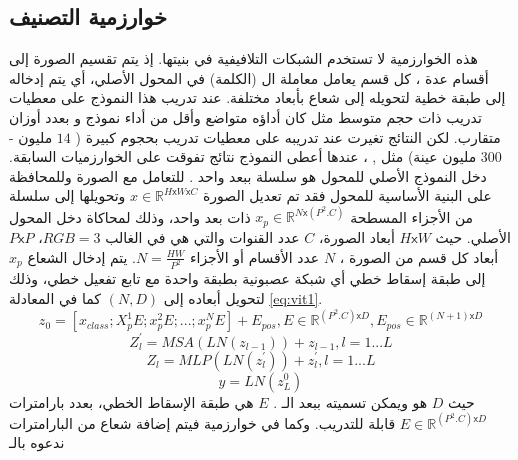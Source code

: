 \subsection{خوارزمية التصنيف
}
هذه الخوارزمية لا تستخدم الشبكات التلافيفية في بنيتها. إذ يتم تقسيم الصورة إلى أقسام عدة
،
كل قسم
يعامل معاملة ال 
(الكلمة) في المحول الأصلي، أي يتم إدخاله إلى طبقة
خطية لتحويله إلى شعاع بأبعاد مختلفة.
\newline
عند تدريب هذا النموذج على معطيات تدريب ذات حجم متوسط مثل
كان أداؤه متواضع وأقل من أداء نموذج
و بعدد أوزان متقارب. لكن النتائج تغيرت عند تدريبه على معطيات تدريب بحجوم كبيرة ( 
$14$
مليون -
$300$ 
مليون عينة) مثل 
,
،
عندها أعطى النموذج نتائج تفوقت على الخوارزميات السابقة.
\newline
دخل النموذج الأصلي للمحول هو سلسلة ببعد واحد . للتعامل مع الصورة وللمحافظة على البنية الأساسية للمحول فقد  تم تعديل الصورة
$x\in \mathds{R}^{H\mathsf{x}W\mathsf{x}C}$
وتحويلها إلى سلسلة من الأجزاء المسطحة
$x_p \in  \mathds{R}^{N\mathsf{x}(P^2.C)}$
ذات بعد واحد، وذلك لمحاكاة دخل المحول الأصلي. حيث
$H\mathsf{x}W$
أبعاد الصورة،
$C$
عدد القنوات والتي هي في الغالب
$RGB = 3$،
$P\mathsf{x}P$
أبعاد كل قسم من الصورة
،
$N$
 عدد الأقسام أو الأجزاء
$N = \frac{HW}{P^2}$.
\newline
يتم إدخال الشعاع 
$x_p$
إلى طبقة إسقاط خطي أي شبكة عصبونية بطبقة واحدة مع تابع تفعيل خطي، وذلك لتحويل أبعاده إلى 
$(N,D)$
كما في المعادلة
\ref{eq:vit1}.
\begin{equation}
z_0 = [x_{class};X_p^1E;x_p^2E;...;x_p^NE]+E_{pos},	E\in \mathds{R}^{(P^2.C)\mathsf{x}D},E_{pos}\in \mathds{R}^{(N+1)\mathsf{x}D}
\label{eq:vit1}
\end{equation}
\begin{equation}
Z_l^\prime = MSA(LN(z_{l-1})) + z_{l-1},	l = 1 ... L
\label{eq:vit2}
\end{equation}
\begin{equation}
Z_l = MLP(LN(z_l^\prime)) + z_l^\prime,	l = 1 ... L
\label{eq:vit3}
\end{equation}
\begin{equation}
y = LN(z_L^0)
\label{eq:vit4}
\end{equation}
حيث
$D$
هو
ويمكن تسميته ببعد الـ
.
$E$
هي طبقة الإسقاط الخطي، بعدد بارامترات
$E \in \mathds{R}^{(P^2.C)\mathsf{x}D}$
قابلة للتدريب.
وكما في خوارزمية
فيتم إضافة شعاع من البارامترات ندعوه بالـ
